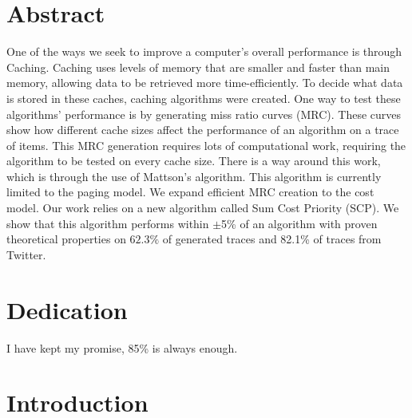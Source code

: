 \documentclass[12pt,twoside]{reedthesis}
\begin{document}
    \chapter*{Abstract}
	One of the ways we seek to improve a computer's overall performance is through Caching. Caching uses levels of memory that are smaller and faster than main memory, allowing data to be retrieved more time-efficiently. To decide what data is stored in these caches, caching algorithms were created. One way to test these algorithms' performance is by generating miss ratio curves (MRC). These curves show how different cache sizes affect the performance of an algorithm on a trace of items. This MRC generation requires lots of computational work, requiring the algorithm to be tested on every cache size. There is a way around this work, which is through the use of Mattson's algorithm. This algorithm is currently limited to the paging model. We expand efficient MRC creation to the cost model. Our work relies on a new algorithm called Sum Cost Priority (SCP). We show that this algorithm performs within $\pm$5\% of an algorithm with proven theoretical properties on $62.3\%$ of generated traces and 82.1\% of traces from Twitter.

 
	\chapter*{Dedication}  
    I have kept my promise, 85\% is always enough.
 
  \mainmatter %
  \pagestyle{fancyplain} %


    \chapter*{Introduction}
\end{document}
